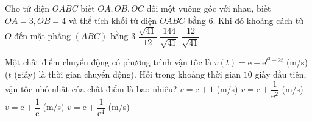 \begin{ex}%
	Cho tứ diện $OABC$ biết $OA,OB,OC$ đôi một vuông góc với nhau, biết $OA=3,OB=4$ và thể tích khối tứ diện $OABC$ bằng $6$. Khi đó khoảng cách từ $O$ đến mặt phẳng $\left(ABC\right)$ bằng
	\choice
	{$3$}
	{$\dfrac{\sqrt{41}}{12}$}
	{$\dfrac{144}{\sqrt{41}}$}
	{\True $\dfrac{12}{\sqrt{41}}$}
\end{ex}
\begin{ex}%
	Một chất điểm chuyển động có phương trình vận tốc là $v(t)=\mathrm{e}+\mathrm{e}^{t^2-2t}$ (m/s) ($t$ (giây) là thời gian chuyển động). Hỏi trong khoảng thời gian $10$ giây đầu tiên, vận tốc nhỏ nhất của chất điểm là bao nhiêu? 
	\choice
	{$v=\mathrm{e}+1$ (m/s)}
	{$v=\mathrm{e}+\dfrac{1}{\mathrm{e}^2}$ (m/s)}
	{\True $v=\mathrm{e}+\dfrac{1}{\mathrm{e}}$ (m/s)}
	{$v=\mathrm{e}+\dfrac{1}{\mathrm{e}^4}$ (m/s)}
\end{ex}
